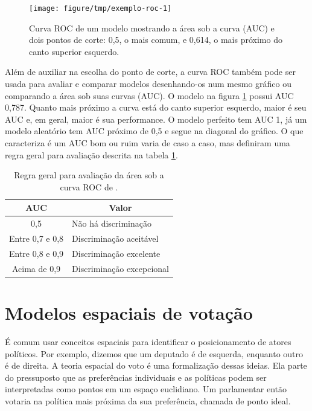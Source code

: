 \documentclass[a4paper,titlepage]{ppgi}\usepackage[]{graphicx}\usepackage[]{color}
\newenvironment{knitrout}{}{} %
\begin{document}
\begin{knitrout}
\color{fgcolor}\begin{figure}
\texttt{[image: figure/tmp/exemplo-roc-1]} \caption[Curva ROC de um modelo mostrando a área sob a curva (AUC) e dois pontos de corte]{Curva ROC de um modelo mostrando a área sob a curva (AUC) e dois pontos de corte: 0,5, o mais comum, e 0,614, o mais próximo do canto superior esquerdo.}\label{fig:exemplo-roc}
\end{figure}


\end{knitrout}

Além de auxiliar na escolha do ponto de corte, a curva ROC também pode ser
usada para avaliar e comparar modelos desenhando-os num mesmo gráfico ou
comparando a área sob suas curvas (AUC). O modelo na figura
\ref{fig:exemplo-roc} possui AUC 0,787. Quanto mais próximo a curva está do
canto superior esquerdo, maior é seu AUC e, em geral, maior é sua performance.
O modelo perfeito tem AUC 1, já um modelo aleatório tem AUC próximo de 0,5 e
segue na diagonal do gráfico. O que caracteriza é um AUC bom ou ruim varia de
caso a caso, mas  definiram uma regra geral para
avaliação descrita na tabela \ref{table:valores-auc}.

\begin{table}
\centering
\begin{tabular}{c l}
  AUC & \multicolumn{1}{c}{Valor} \\
  \hline
  0,5 & Não há discriminação \\
  Entre 0,7 e 0,8 & Discriminação aceitável \\
  Entre 0,8 e 0,9 & Discriminação excelente \\
  Acima de 0,9 & Discriminação excepcional \\
\end{tabular}
\caption{Regra geral para avaliação da área sob a curva ROC de .}
\label{table:valores-auc}
\end{table}


\section{Modelos espaciais de votação}



É comum usar conceitos espaciais para identificar o posicionamento de
atores políticos. Por exemplo, dizemos que um deputado é de esquerda, enquanto
outro é de direita. A teoria espacial do voto é uma formalização dessas ideias.
Ela parte do pressuposto que as preferências individuais e as políticas podem
ser interpretadas como pontos em um espaço euclidiano. Um parlamentar então
votaria na política mais próxima da sua preferência, chamada de ponto ideal.
\end{document}
